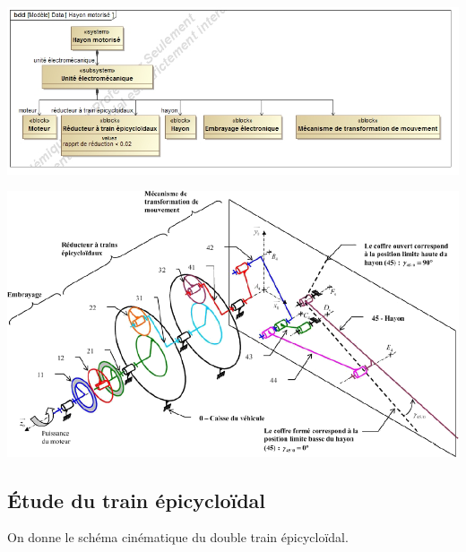 \documentclass[10pt,fleqn]{article} %
\begin{document}
\begin{multicols}{2}
\begin{multicols}{2}
\begin{center}
\includegraphics[width=.95\linewidth]{images/SysML/BDD}
\end{center}


\begin{center}
\includegraphics[width=.95\linewidth]{images/A6_schema}
\end{center}

\fi

\subsection*{Étude du train épicycloïdal}
\ifprof
\else

On donne le schéma cinématique du double train épicycloïdal. 



\end{multicols}
\end{multicols}
\end{document}
